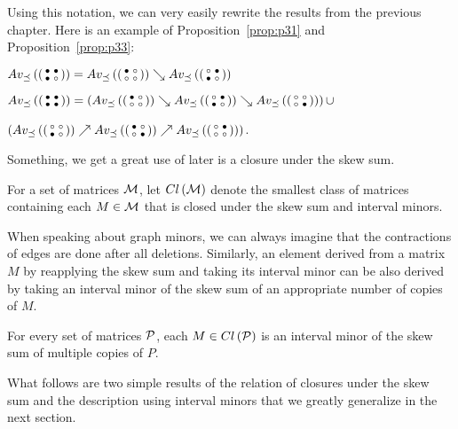Using this notation, we can very easily rewrite the results from the previous chapter. Here is an example of Proposition~\ref{prop:p31} and Proposition~\ref{prop:p33}:

\begin{prop}
$Av_{\preceq}\left(\left(\begin{smallmatrix}\bullet&\bullet\\\bullet&\circ\end{smallmatrix}\right)\right)=Av_{\preceq}\left(\left(\begin{smallmatrix}\bullet&\circ\\\circ&\circ\end{smallmatrix}\right)\right)\searrow Av_{\preceq}\left(\left(\begin{smallmatrix}\circ&\bullet\\\bullet&\circ\end{smallmatrix}\right)\right)$
\end{prop}

\begin{prop}
$Av_{\preceq}\left(\left(\begin{smallmatrix}\bullet&\bullet\\\bullet&\bullet\end{smallmatrix}\right)\right)=\left(Av_{\preceq}\left(\left(\begin{smallmatrix}\bullet&\circ\\\circ&\circ\end{smallmatrix}\right)\right)\searrow Av_{\preceq}\left(\left(\begin{smallmatrix}\circ&\bullet\\\bullet&\circ\end{smallmatrix}\right)\right)\searrow Av_{\preceq}\left(\left(\begin{smallmatrix}\circ&\circ\\\circ&\bullet\end{smallmatrix}\right)\right)\right)\cup$

\hspace{54mm}$\left(Av_{\preceq}\left(\left(\begin{smallmatrix}\circ&\circ\\\bullet&\circ\end{smallmatrix}\right)\right)\nearrow Av_{\preceq}\left(\left(\begin{smallmatrix}\bullet&\circ\\\circ&\bullet\end{smallmatrix}\right)\right)\nearrow Av_{\preceq}\left(\left(\begin{smallmatrix}\circ&\bullet\\\circ&\circ\end{smallmatrix}\right)\right)\right)$.
\end{prop}

Something, we get a great use of later is a closure under the skew sum.

\begin{defn}
For a set of matrices $\mathcal{M}$, let $Cl\left(\mathcal{M}\right)$ denote the smallest class of matrices containing each $M\in\mathcal{M}$ that is closed under the skew sum and interval minors.
\end{defn}

When speaking about graph minors, we can always imagine that the contractions of edges are done after all deletions. Similarly, an element derived from a matrix~$M$ by reapplying the skew sum and taking its interval minor can be also derived by taking an interval minor of the skew sum of an appropriate number of copies of $M$.

\begin{obs}
For every set of matrices $\mathcal{P}$, each $M\in Cl\left(\mathcal{P}\right)$ is an interval minor of the skew sum of multiple copies of $P$.
\end{obs}

What follows are two simple results of the relation of closures under the skew sum and the description using interval minors that we greatly generalize in the next section.

